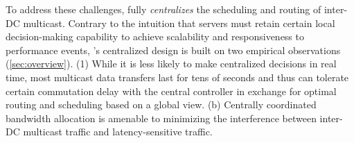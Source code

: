 %

To address these challenges, \name fully {\em centralizes}
the scheduling and routing of inter-DC multicast.
Contrary to the intuition that servers must retain certain
local decision-making capability to achieve scalability and
responsiveness to performance events, \name's centralized design
is built on two empirical observations (\Section\ref{sec:overview}).
(1) While it is less likely to make
centralized decisions in real time, most multicast data transfers
last for tens of seconds and thus can tolerate certain commutation delay with
the central controller in exchange for optimal routing and scheduling based on a global view.
(b) Centrally coordinated bandwidth allocation is amenable
to minimizing the interference between inter-DC multicast
traffic and latency-sensitive traffic.%


